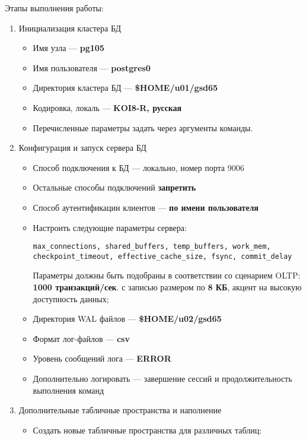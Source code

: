 \documentclass{article}
\begin{document}
Этапы выполнения работы:
\begin{enumerate}
    \item Инициализация кластера БД
          \begin{itemize}
              \item Имя узла — \textbf{pg105}
              \item Имя пользователя — \textbf{postgres0}
              \item Директория кластера БД — \textbf{\$HOME/u01/gsd65}
              \item Кодировка, локаль — \textbf{KOI8-R, русская}
              \item Перечисленные параметры задать через аргументы команды.
          \end{itemize}
    \item Конфигурация и запуск сервера БД
          \begin{itemize}
              \item Способ подключения к БД — локально, номер порта 9006
              \item Остальные способы подключений \textbf{запретить}
              \item Способ аутентификации клиентов — \textbf{по имени пользователя}
              \item Настроить следующие параметры сервера: \begin{verbatim}
max_connections, shared_buffers, temp_buffers, work_mem,
checkpoint_timeout, effective_cache_size, fsync, commit_delay\end{verbatim}
               Параметры должны быть подобраны в соответствии со сценарием OLTP: \textbf{1000 транзакций/сек}. с записью размером по \textbf{8 КБ}, акцент на высокую доступность данных;
              \item Директория WAL файлов — \textbf{\$HOME/u02/gsd65}
              \item Формат лог-файлов — \textbf{csv}
              \item Уровень сообщений лога — \textbf{ERROR}
              \item Дополнительно логировать — завершение сессий и продолжительность
выполнения команд
          \end{itemize}
    \item Дополнительные табличные пространства и наполнение
          \begin{itemize}
              \item Создать новые табличные пространства для различных таблиц:

\end{itemize}
\end{enumerate}
\end{document}
